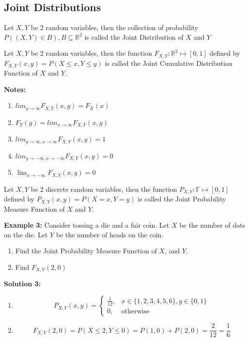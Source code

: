 \documentclass[12pt, twoside]{article}
\begin{document}
\subsection{Joint Distributions}

\begin{tcolorbox}[title=Definition: Joint Distribution]
	Let $X,Y$ be 2 random variables, then the collection of probability $P((X,Y)\in B), B \subseteq \mathbb{R}^2$ is called the Joint Distribution of $X$ and $Y$
\end{tcolorbox}

\begin{tcolorbox}[title=Definition: Joint Cumulative Distribution Function of 2 Random Variables $X$ and $Y$]
	Let $X,Y$ be 2 random variables, then the function $F_{X,Y} : \mathbb{R}^2 \mapsto [0,1]$ defined by $F_{X,Y} (x,y) = P(X \leq x, Y \leq y)$ is called the Joint Cumulative Distribution Function of $X$ and $Y$.
\end{tcolorbox}

\textbf{Notes:}
\begin{enumerate}
	\item{$lim_{y\to\infty} F_{X,Y} (x,y) = F_X (x)$}
	\item{$F_Y (y) = lim_{x\to\infty} F_{X,Y} (x,y)$}
	\item{$lim_{y\to\infty, x\to\infty} F_{X,Y} (x,y) = 1$}
	\item{$lim_{y\to-\infty, x\to-\infty} F_{X,Y} (x,y) = 0$}
	\item{$\lim_{x\to-\infty} F_{X,Y} (x,y) = 0$}
\end{enumerate}

\begin{tcolorbox}[title=Joint Probability Measure Function of 2 Discrete Random Variables]
	Let $X,Y$ be 2 discrete random variables, then the function $P_{X,Y} : \mathbb{F} \mapsto [0,1]$ defined by $P_{X,Y} (x,y) = P(X = x, Y = y)$ is called the Joint Probability Measure Function of $X$ and $Y$.
\end{tcolorbox}

\textbf{Example 3:} Consider tossing a die and a fair coin. Let $X$ be the number of dots on the die. Let $Y$ be the number of heads on the coin.
\begin{enumerate}
	\item{Find the Joint Probability Measure Function of $X$, and $Y$.}
	\item{Find $F_{X,Y} (2,0)$}
\end{enumerate}

\textbf{Solution 3:}
\begin{enumerate}
	\item{$$P_{X,Y} (x,y) = \begin{cases}
		\frac{1}{12}, & x\in \{ 1,2,3,4,5,6 \}, y\in \{ 0,1 \}\\
		0, & \text{otherwise}
	\end{cases}
$$}
	\item{$$F_{X,Y} (2,0) = P(X \leq 2, Y \leq 0) = P(1,0) + P(2,0) = \frac{2}{12} = \frac{1}{6}$$}
\end{enumerate}
\end{document}
